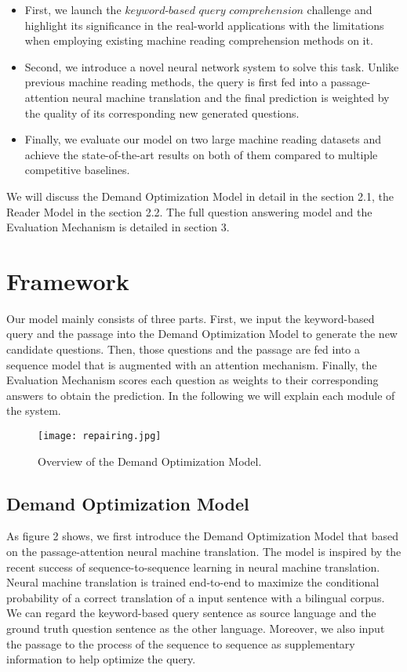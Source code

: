 \documentclass[sigconf]{acmart}
\begin{document}
\begin{itemize}
\item First, we launch the $keyword$-$based$ $query$ $comprehension$ challenge and highlight its significance in the real-world applications with the limitations when employing existing machine reading comprehension methods on it. 

\item Second, we introduce a novel  neural network system to solve this task. Unlike previous machine reading methods, the query is first fed into a passage-attention neural machine translation and the final prediction is weighted by the quality of its corresponding new generated questions. 

\item Finally, we evaluate our model on two large machine reading datasets and achieve the state-of-the-art results on both of them compared to multiple competitive baselines.
\end{itemize}

We will discuss the Demand Optimization Model in detail in the section 2.1, the Reader Model in the section 2.2. The full question answering model and the Evaluation Mechanism is detailed in section 3.

\section{Framework}
Our model mainly consists of three parts. First, we input the keyword-based query and the passage into the Demand Optimization Model to generate the new candidate questions. Then, those questions and the passage are fed into a sequence model that is augmented with an attention mechanism. Finally, the Evaluation Mechanism scores each question as weights to their corresponding answers to obtain the prediction. In the following we will explain each module of the system.

\begin{figure*}[t]
  \begin{center}
  \texttt{[image: repairing.jpg]}
  \caption{Overview of the Demand Optimization Model.}
  \end{center}
\end{figure*}




\subsection{Demand Optimization Model}
As figure 2 shows, we first introduce the Demand Optimization Model that based on the passage-attention neural machine translation. The model is inspired by the recent success of sequence-to-sequence learning in neural machine translation. Neural machine translation is trained end-to-end to maximize the conditional probability of a correct translation of a input sentence with a bilingual corpus. We can regard the keyword-based query sentence as source language and the ground truth question sentence as the other language. Moreover, we also input the passage to the process of the sequence to sequence as supplementary information to help optimize the query. 
\end{document}
